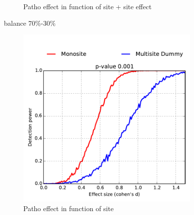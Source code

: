 \documentclass[authoryear]{elsarticle}
\begin{document}
\begin{figure}
\begin{subfigure}[b]{0.475\textwidth}
            {{\tiny Patho effect in function of site + site effect}}    
            \label{fig:mean and std of net44}
        \end{subfigure}
        \caption[]
        {\small balance 70\%-30\%} 
        \label{fig:mean and std of nets}
    \end{figure}
    
    
\begin{figure}
        \centering
        \begin{subfigure}[b]{0.475\textwidth}
            \centering
            \includegraphics[width=\textwidth]{../figures/detect_pow_2080bal5050_var2_site0.pdf}
            {\tiny{ Patho effect in function of site}}    
            \label{fig:2080 bal5050 var2 site0}
        \end{subfigure}
        \hfill
        \begin{subfigure}[b]{0.475\textwidth}  
            \centering 

\end{subfigure}
\end{figure}
\end{document}
